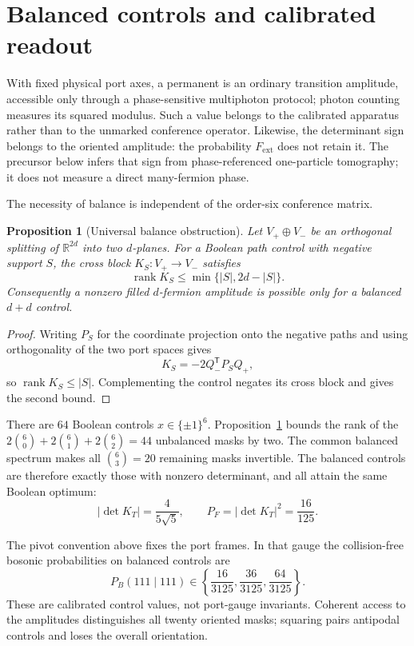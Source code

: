 \documentclass[11pt]{article}
\newtheorem{proposition}[theorem]{Proposition}
\theoremstyle{remark}
\begin{document}
\section{Balanced controls and calibrated readout}

With fixed physical port axes, a permanent is an ordinary transition amplitude,
accessible only through a phase-sensitive multiphoton protocol; photon
counting measures its squared modulus.  Such a value belongs to the calibrated
apparatus rather than to the unmarked conference operator.  Likewise, the
determinant sign belongs to the oriented amplitude: the probability
\(F_{\mathrm{ext}}\) does not retain it.  The precursor below infers that sign
from phase-referenced one-particle tomography; it does not measure a direct
many-fermion phase.

The necessity of balance is independent of the order-six conference matrix.

\begin{proposition}[Universal balance obstruction]
\label{prop:balance-obstruction}
Let \(V_+\oplus V_-\) be an orthogonal splitting of
\(\mathbb R^{2d}\) into two \(d\)-planes.  For a Boolean path control with
negative support \(S\), the cross block \(K_S:V_+\to V_-\) satisfies
\[
 \operatorname{rank}K_S\leq\min\{|S|,2d-|S|\}.
\]
Consequently a nonzero filled \(d\)-fermion amplitude is possible only for a
balanced \(d+d\) control.
\end{proposition}

\begin{proof}
Writing \(P_S\) for the coordinate projection onto the negative paths and
using orthogonality of the two port spaces gives
\[
 K_S=-2Q_-^{\mathsf T}P_SQ_+,
\]
so \(\operatorname{rank}K_S\leq|S|\).  Complementing the control negates its
cross block and gives the second bound.
\end{proof}

There are \(64\) Boolean controls \(x\in\{\pm1\}^6\).
Proposition~\ref{prop:balance-obstruction} bounds the rank of the
\(2\binom60+2\binom61+2\binom62=44\) unbalanced masks by two.  The common
balanced spectrum makes all \(\binom63=20\) remaining masks invertible.
The balanced controls are therefore exactly those with nonzero determinant,
and all attain the same Boolean optimum:
\[
 |\det K_T|=\frac{4}{5\sqrt5},\qquad
 P_F=|\det K_T|^2=\frac{16}{125}.
\]

The pivot convention above fixes the port frames.  In that gauge the
collision-free bosonic probabilities on balanced controls are
\[
 P_B(111\mid111)\in
 \left\{\frac{16}{3125},\frac{36}{3125},\frac{64}{3125}\right\}.
\]
These are calibrated control values, not port-gauge invariants.  Coherent
access to the amplitudes distinguishes all twenty oriented masks; squaring
pairs antipodal controls and loses the overall orientation.
\end{document}

